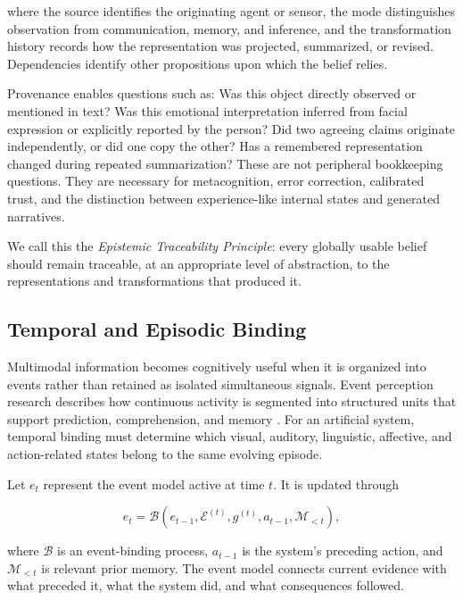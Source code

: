 where the source identifies the originating agent or sensor, the mode distinguishes observation from communication, memory, and inference, and the transformation history records how the representation was projected, summarized, or revised. Dependencies identify other propositions upon which the belief relies.

Provenance enables questions such as: Was this object directly observed or mentioned in text? Was this emotional interpretation inferred from facial expression or explicitly reported by the person? Did two agreeing claims originate independently, or did one copy the other? Has a remembered representation changed during repeated summarization? These are not peripheral bookkeeping questions. They are necessary for metacognition, error correction, calibrated trust, and the distinction between experience-like internal states and generated narratives.

We call this the \emph{Epistemic Traceability Principle}: every globally usable belief should remain traceable, at an appropriate level of abstraction, to the representations and transformations that produced it.

\subsection{Temporal and Episodic Binding}
\label{subsec:temporal-episodic-binding}

Multimodal information becomes cognitively useful when it is organized into events rather than retained as isolated simultaneous signals. Event perception research describes how continuous activity is segmented into structured units that support prediction, comprehension, and memory \cite{zacks2007event}. For an artificial system, temporal binding must determine which visual, auditory, linguistic, affective, and action-related states belong to the same evolving episode.

Let $e_t$ represent the event model active at time $t$. It is updated through

\begin{equation}
e_t
=
\mathcal{B}
\left(
e_{t-1},
\mathcal{E}^{(t)},
g^{(t)},
a_{t-1},
\mathcal{M}_{<t}
\right),
\label{eq:event-binding}
\end{equation}

where $\mathcal{B}$ is an event-binding process, $a_{t-1}$ is the system's preceding action, and $\mathcal{M}_{<t}$ is relevant prior memory. The event model connects current evidence with what preceded it, what the system did, and what consequences followed.

